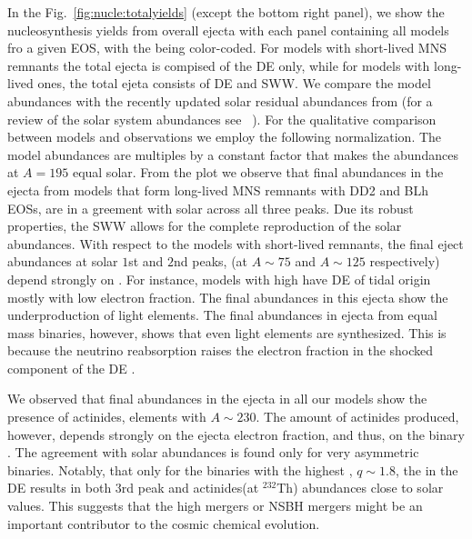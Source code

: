 In the Fig.~\ref{fig:nucle:totalyields} (except the bottom right panel), 
we show the nucleosynthesis yields from overall ejecta with each panel 
containing all models fro a given \ac{EOS}, with the \mr{} being color-coded.
For models with short-lived \ac{MNS} remnants the total ejecta is compised 
of the \ac{DE} only, while for models with long-lived ones, the total ejeta 
consists of \ac{DE} and \ac{SWW}. 
We compare the model abundances with the recently updated solar residual 
\rproc{} abundances from \citet{Prantzos2020} 
(for a review of the solar system abundances see \eg~\citealt{Pritychenko:2019xvf}).
For the qualitative comparison between models and observations we employ 
the following normalization. 
The model abundances are multiples by a constant factor that makes the abundances at 
$A=195$ equal solar.
From the plot we observe that final \rproc{} abundances in the ejecta from models that 
form long-lived \ac{MNS} remnants with DD2 and BLh \acp{EOS}, are in a greement with 
solar across all three \rproc{} peaks. 
Due its robust properties, the \ac{SWW} allows for the complete reproduction 
of the solar \rproc{} abundances. 
With respect to the models with short-lived remnants, the final \rproc{} eject abundances 
at solar $1$st and $2$nd \rproc{} peaks, (at $A\sim 75$ and $A\sim 125$ respectively) 
depend strongly on \mr{}. 
For instance, models with high \mr{} have \ac{DE} of tidal origin mostly with low 
electron fraction. The final \rproc{} abundances in this ejecta show the underproduction 
of light elements. 
The final abundances in ejecta from equal mass binaries, 
however, shows that even light \rproc{} elements are 
synthesized. This is because the neutrino reabsorption raises the electron fraction 
in the shocked component of the \ac{DE} \citep{Wanajo:2014wha,Radice:2018pdn}. 

We observed that final abundances in the ejecta in all our models show the 
presence of actinides, elements with $A\sim230$. 
The amount of actinides produced, however, depends strongly on the ejecta 
electron fraction, and thus, on the binary \mr{}.
The agreement with solar abundances is found only for very asymmetric binaries. 
Notably, that only for the binaries with the highest \mr{}, $q\sim1.8$, the 
\rproc{} in the \ac{DE} results in both $3$rd peak and actinides(at $^{232}$Th) abundances 
close to solar values. 
This suggests that the high \mr{} mergers or \ac{NSBH} mergers might be an 
important contributor to the cosmic chemical evolution.

